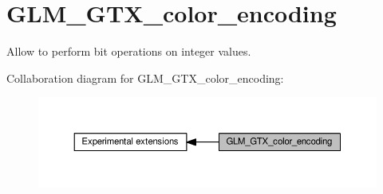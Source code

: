 \hypertarget{group__gtx__color__encoding}{}\section{G\+L\+M\+\_\+\+G\+T\+X\+\_\+color\+\_\+encoding}
\label{group__gtx__color__encoding}


Allow to perform bit operations on integer values.  


Collaboration diagram for G\+L\+M\+\_\+\+G\+T\+X\+\_\+color\+\_\+encoding\+:
\nopagebreak
\begin{figure}[H]
\begin{center}
\leavevmode
\includegraphics[width=350pt]{dd/d33/group__gtx__color__encoding}
\end{center}
\end{figure}
